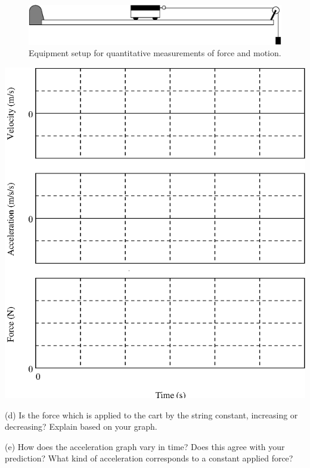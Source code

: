 \begin{figure}
{\par\centering \includegraphics{force1_fig4.eps} \par}


\caption{Equipment setup for quantitative measurements of force and motion.}
\end{figure}


\vspace{0.3cm}
{\par\centering \includegraphics{force1_fig5.eps} \par}
\vspace{0.3cm}

(d) Is the force which is applied to the cart by the string constant, increasing
or decreasing? Explain based on your graph.
\vspace{20mm}

(e) How does the acceleration graph vary in time? Does this agree with your
prediction? What kind of acceleration corresponds to a constant applied force?
\vspace{20mm}

